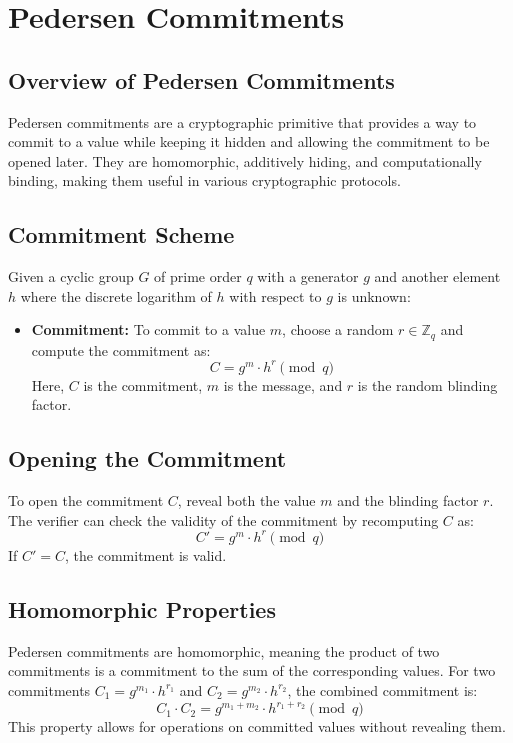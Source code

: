 \documentclass[12pt,a4paper]{report}
\begin{document}
\section{Pedersen Commitments}

\subsection{Overview of Pedersen Commitments}
Pedersen commitments are a cryptographic primitive that provides a way to commit to a value while keeping it hidden and allowing the commitment to be opened later. They are homomorphic, additively hiding, and computationally binding, making them useful in various cryptographic protocols.

\subsection{Commitment Scheme}
Given a cyclic group \( G \) of prime order \( q \) with a generator \( g \) and another element \( h \) where the discrete logarithm of \( h \) with respect to \( g \) is unknown:
\begin{itemize}
    \item \textbf{Commitment:} To commit to a value \( m \), choose a random \( r \in \mathbb{Z}_q \) and compute the commitment as:
    \[
    C = g^m \cdot h^r \pmod q
    \]
    Here, \( C \) is the commitment, \( m \) is the message, and \( r \) is the random blinding factor.
\end{itemize}

\subsection{Opening the Commitment}
To open the commitment \( C \), reveal both the value \( m \) and the blinding factor \( r \). The verifier can check the validity of the commitment by recomputing \( C \) as:
\[
C' = g^m \cdot h^r \pmod q
\]
If \( C' = C \), the commitment is valid.

\subsection{Homomorphic Properties}
Pedersen commitments are homomorphic, meaning the product of two commitments is a commitment to the sum of the corresponding values. For two commitments \( C_1 = g^{m_1} \cdot h^{r_1} \) and \( C_2 = g^{m_2} \cdot h^{r_2} \), the combined commitment is:
\[
C_1 \cdot C_2 = g^{m_1 + m_2} \cdot h^{r_1 + r_2} \pmod q
\]
This property allows for operations on committed values without revealing them.
\end{document}
